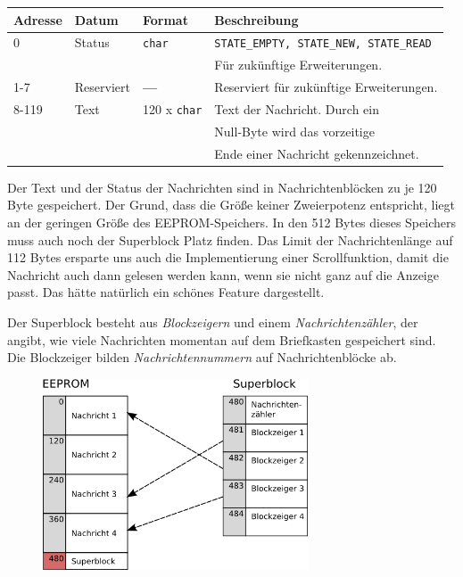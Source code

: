 \documentclass[ngerman]{article}
\begin{document}
\begin{tabular}{|l|l|l|l|}
    \hline
    {\bf Adresse} & {\bf Datum} & {\bf Format} & {\bf Beschreibung} \\
    \hline
    \hline
    0 & Status & {\tt char} & {\tt STATE\_EMPTY, STATE\_NEW,  STATE\_READ} \\
                          &&& Für zukünftige Erweiterungen. \\
    \hline
    1-7 & Reserviert & {\bf --- }  & Reserviert für zukünftige Erweiterungen. \\
    \hline
    8-119 & Text & 120 x {\tt char} & Text der Nachricht. Durch ein \\
                                  &&& Null-Byte wird das vorzeitige \\
                                  &&& Ende einer Nachricht gekennzeichnet. \\
    \hline
\end{tabular}

Der Text und der Status der Nachrichten sind in Nachrichtenblöcken zu je 120
Byte gespeichert. Der Grund, dass die Größe keiner Zweierpotenz entspricht,
liegt an der geringen Größe des EEPROM-Speichers. In den 512 Bytes dieses
Speichers muss auch noch der Superblock Platz finden. Das Limit der
Nachrichtenlänge auf 112 Bytes ersparte uns auch die Implementierung einer
Scrollfunktion, damit die Nachricht auch dann gelesen werden kann, wenn sie
nicht ganz auf die Anzeige passt. Das hätte natürlich ein schönes Feature
dargestellt.

Der Superblock besteht aus \textit{Blockzeigern} und einem
\textit{Nachrichtenzähler}, der angibt, wie viele Nachrichten momentan auf dem
Briefkasten gespeichert sind. Die Blockzeiger bilden
\textit{Nachrichtennummern} auf Nachrichtenblöcke ab.

\begin{figure}[h!] \begin{center}
    \includegraphics[width=0.7\textwidth]{media/eeprom}
\end{center} \end{figure}
\end{document}
